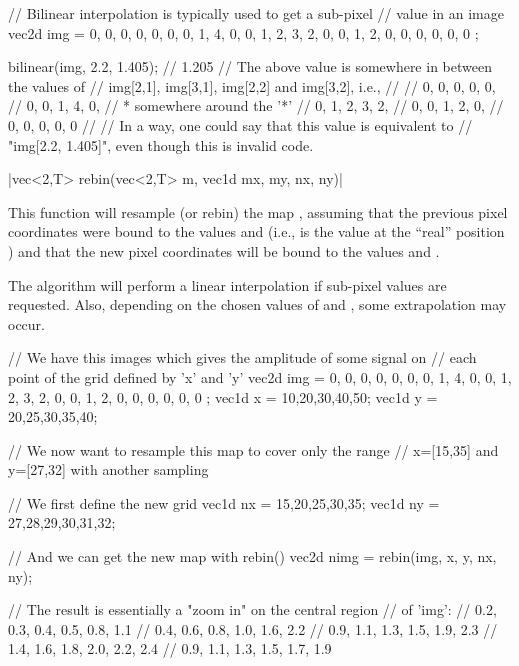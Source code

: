 \begin{example}
\begin{cppcode}
// Bilinear interpolation is typically used to get a sub-pixel
// value in an image
vec2d img = {
    {0, 0, 0, 0, 0},
    {0, 0, 1, 4, 0},
    {0, 1, 2, 3, 2},
    {0, 0, 1, 2, 0},
    {0, 0, 0, 0, 0}
};

bilinear(img, 2.2, 1.405); // 1.205
// The above value is somewhere in between the values of
// img[2,1], img[3,1], img[2,2] and img[3,2], i.e.,
//
//  {0, 0, 0, 0, 0},
//  {0, 0, 1, 4, 0},
//          *          somewhere around the '*'
//  {0, 1, 2, 3, 2},
//  {0, 0, 1, 2, 0},
//  {0, 0, 0, 0, 0}
//
// In a way, one could say that this value is equivalent to
// "img[2.2, 1.405]", even though this is invalid code.
\end{cppcode}
\end{example}

\funcitem \cppinline|vec<2,T> rebin(vec<2,T> m, vec1d mx, my, nx, ny)| 

This function will resample (or rebin) the map , assuming that the previous pixel coordinates were bound to the values  and  (i.e.,  is the value at the ``real'' position ) and that the new pixel coordinates will be bound to the values  and .

The algorithm will perform a linear interpolation if sub-pixel values are requested. Also, depending on the chosen values of  and , some extrapolation may occur.

\begin{example}
\begin{cppcode}
// We have this images which gives the amplitude of some signal on
// each point of the grid defined by 'x' and 'y'
vec2d img = {
    {0, 0, 0, 0, 0},
    {0, 0, 1, 4, 0},
    {0, 1, 2, 3, 2},
    {0, 0, 1, 2, 0},
    {0, 0, 0, 0, 0}
};
vec1d x = {10,20,30,40,50};
vec1d y = {20,25,30,35,40};

// We now want to resample this map to cover only the range
// x=[15,35] and y=[27,32] with another sampling

// We first define the new grid
vec1d nx = {15,20,25,30,35};
vec1d ny = {27,28,29,30,31,32};

// And we can get the new map with rebin()
vec2d nimg = rebin(img, x, y, nx, ny);

// The result is essentially a "zoom in" on the central region
// of 'img':
// {0.2, 0.3, 0.4, 0.5, 0.8, 1.1}
// {0.4, 0.6, 0.8, 1.0, 1.6, 2.2}
// {0.9, 1.1, 1.3, 1.5, 1.9, 2.3}
// {1.4, 1.6, 1.8, 2.0, 2.2, 2.4}
// {0.9, 1.1, 1.3, 1.5, 1.7, 1.9}
\end{cppcode}
\end{example}
